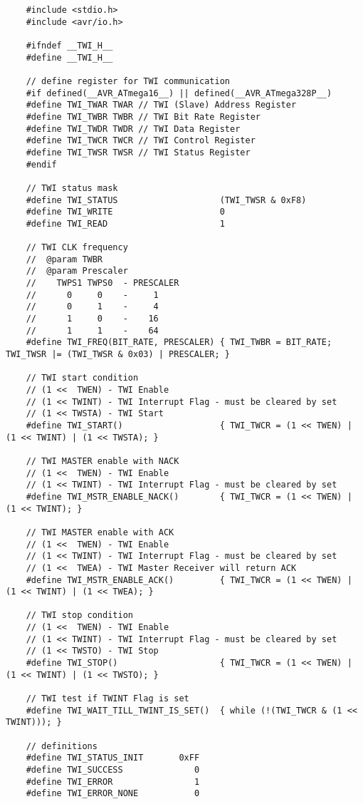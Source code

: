 \begin{lstlisting}
	#include <stdio.h>
	#include <avr/io.h>
	
	#ifndef __TWI_H__
	#define __TWI_H__
	
	// define register for TWI communication
	#if defined(__AVR_ATmega16__) || defined(__AVR_ATmega328P__)
	#define TWI_TWAR TWAR // TWI (Slave) Address Register
	#define TWI_TWBR TWBR // TWI Bit Rate Register
	#define TWI_TWDR TWDR // TWI Data Register
	#define TWI_TWCR TWCR // TWI Control Register
	#define TWI_TWSR TWSR // TWI Status Register
	#endif
	
	// TWI status mask
	#define TWI_STATUS                    (TWI_TWSR & 0xF8)
	#define TWI_WRITE                     0
	#define TWI_READ                      1
	
	// TWI CLK frequency
	//  @param TWBR
	//  @param Prescaler
	//    TWPS1 TWPS0  - PRESCALER
	//      0     0    -     1
	//      0     1    -     4
	//      1     0    -    16
	//      1     1    -    64
	#define TWI_FREQ(BIT_RATE, PRESCALER) { TWI_TWBR = BIT_RATE; TWI_TWSR |= (TWI_TWSR & 0x03) | PRESCALER; }
	
	// TWI start condition
	// (1 <<  TWEN) - TWI Enable
	// (1 << TWINT) - TWI Interrupt Flag - must be cleared by set
	// (1 << TWSTA) - TWI Start
	#define TWI_START()                   { TWI_TWCR = (1 << TWEN) | (1 << TWINT) | (1 << TWSTA); }
	
	// TWI MASTER enable with NACK
	// (1 <<  TWEN) - TWI Enable
	// (1 << TWINT) - TWI Interrupt Flag - must be cleared by set
	#define TWI_MSTR_ENABLE_NACK()        { TWI_TWCR = (1 << TWEN) | (1 << TWINT); }
	
	// TWI MASTER enable with ACK
	// (1 <<  TWEN) - TWI Enable
	// (1 << TWINT) - TWI Interrupt Flag - must be cleared by set
	// (1 <<  TWEA) - TWI Master Receiver will return ACK
	#define TWI_MSTR_ENABLE_ACK()         { TWI_TWCR = (1 << TWEN) | (1 << TWINT) | (1 << TWEA); }
	
	// TWI stop condition
	// (1 <<  TWEN) - TWI Enable
	// (1 << TWINT) - TWI Interrupt Flag - must be cleared by set
	// (1 << TWSTO) - TWI Stop
	#define TWI_STOP()                    { TWI_TWCR = (1 << TWEN) | (1 << TWINT) | (1 << TWSTO); }
	
	// TWI test if TWINT Flag is set
	#define TWI_WAIT_TILL_TWINT_IS_SET()  { while (!(TWI_TWCR & (1 << TWINT))); }
	
	// definitions
	#define TWI_STATUS_INIT       0xFF
	#define TWI_SUCCESS              0
	#define TWI_ERROR                1
	#define TWI_ERROR_NONE           0 
	

\end{lstlisting}
